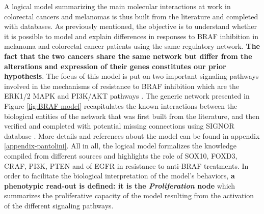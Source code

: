 \documentclass[a4paper,12pt,twoside,onecolumn,openright,final,oldfontcommands]{memoir}
\begin{document}
A logical model summarizing the main molecular interactions at work in
colorectal cancers and melanomas is thus built from the literature and
completed with databases. As previously mentioned, the objective is to
understand whether it is possible to model and explain differences in
responses to BRAF inhibition in melanoma and colorectal cancer patients
using the same regulatory network. \textbf{The fact that the two cancers
share the same network but differ from the alterations and expression of
their genes constitutes our prior hypothesis}. The focus of this model
is put on two important signaling pathways involved in the mechanisms of
resistance to BRAF inhibition which are the ERK1/2 MAPK and PI3K/AKT
pathways \citep{ursem2018emerging, rossi2019drug}. The generic network
presented in Figure \ref{fig:BRAF-model} recapitulates the known
interactions between the biological entities of the network that was
first built from the literature, and then verified and completed with
potential missing connections using SIGNOR database
\citep{perfetto2016signor}. More details and references about the model
can be found in appendix \ref{appendix-pantolini}. All in all, the
logical model formalizes the knowledge compiled from different sources
and highlights the role of SOX10, FOXD3, CRAF, PI3K, PTEN and of EGFR in
resistance to anti-BRAF treatments. In order to facilitate the
biological interpretation of the model's behaviors, \textbf{a phenotypic
read-out is defined: it is the \emph{Proliferation} node} which
summarizes the proliferative capacity of the model resulting from the
activation of the different signaling pathways.
\end{document}
